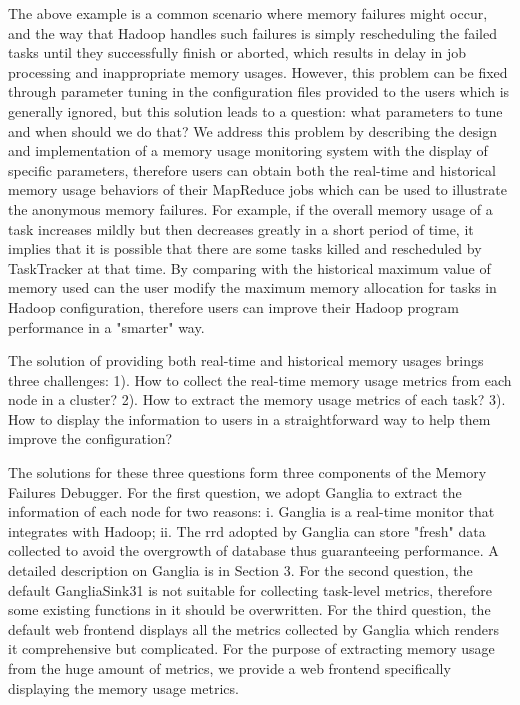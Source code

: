 The above example is a common scenario where memory failures might occur, and the way that Hadoop handles such failures is simply rescheduling the failed tasks until they successfully finish or aborted, which results in delay in job processing and inappropriate memory usages.
However, this problem can be fixed through parameter tuning in the configuration files provided to the users which is generally ignored, but this solution leads to a question: what parameters to tune and when should we do that? 
We address this problem by describing the design and implementation of a memory usage monitoring system with the display of specific parameters, therefore users can obtain both the real-time and historical memory usage behaviors of their MapReduce jobs which can be used to illustrate the anonymous memory failures.
For example, if the overall memory usage of a task increases mildly but then decreases greatly in a short period of time, it implies that it is possible that there are some tasks killed and rescheduled by TaskTracker at that time.
By comparing with the historical maximum value of memory used can the user modify the maximum memory allocation for tasks in Hadoop configuration, therefore users can improve their Hadoop program performance in a "smarter" way.
\par
The solution of providing both real-time and historical memory usages brings three challenges: 1). How to collect the real-time memory usage metrics from each node in a cluster? 2). How to extract the memory usage metrics of each task? 3). How to display the information to users in a straightforward way to help them improve the configuration?
\par
The solutions for these three questions form three components of the Memory Failures Debugger. For the first question, we adopt Ganglia to extract the information of each node for two reasons: i. Ganglia is a real-time monitor that integrates with Hadoop; ii. The rrd adopted by Ganglia can store "fresh" data collected to avoid the overgrowth of database thus guaranteeing performance. A detailed description on Ganglia is in Section 3.
For the second question, the default GangliaSink31 is not suitable for collecting task-level metrics, therefore some existing functions in it should be overwritten.
For the third question, the default web frontend displays all the metrics collected by Ganglia which renders it comprehensive but complicated. For the purpose of extracting memory usage from the huge amount of metrics, we provide a web frontend specifically displaying the memory usage metrics.
